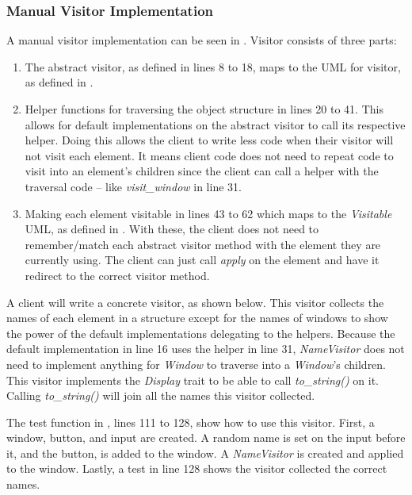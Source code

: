\subsubsection{Manual Visitor Implementation}
\label{sec:visitor-manual-implementation}

A manual visitor implementation can be seen in .
Visitor consists of three parts:
\begin{enumerate}
	\item The abstract visitor, as defined in lines 8 to 18, maps to the UML for visitor, as defined in .
	\item Helper functions for traversing the object structure \cite{gamma_94_01} in lines 20 to 41.
	      This allows for default implementations on the abstract visitor to call its respective helper.
	      Doing this allows the client to write less code when their visitor will not visit each element.
	      It means client code does not need to repeat code to visit into an element's children since the client can call a helper with the traversal code -- like \textit{visit\_window} in line 31.
	\item Making each element visitable in lines 43 to 62 which maps to the \textit{Visitable} UML, as defined in .
	      With these, the client does not need to remember/match each abstract visitor method with the element they are currently using.
	      The client can just call \textit{apply} on the element and have it redirect to the correct visitor method.
\end{enumerate}

A client will write a concrete visitor, as shown below.
This visitor collects the names of each element in a structure except for the names of windows to show the power of the default implementations delegating to the helpers.
Because the default implementation in  line 16 uses the helper in line 31, \textit{NameVisitor} does not need to implement anything for \textit{Window} to traverse into a \textit{Window}'s children.
This visitor implements the \textit{Display} trait to be able to call \textit{to\_string()} on it.
Calling \textit{to\_string()} will join all the names this visitor collected.


The test function in , lines 111 to 128, show how to use this visitor.
First, a window, button, and input are created.
A random name is set on the input before it, and the button, is added to the window.
A \textit{NameVisitor} is created and applied to the window.
Lastly, a test in line 128 shows the visitor collected the correct names.

